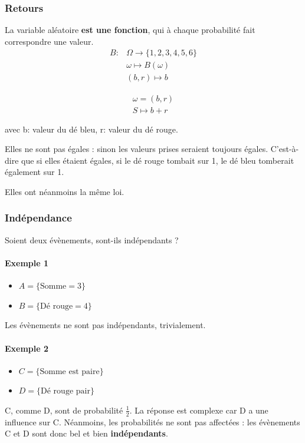 \documentclass[11pt]{article}
\begin{document}
\subsubsection{Retours}
La variable aléatoire \textbf{est une fonction}, qui à chaque probabilité fait
correspondre une valeur.
\begin{align*}
    B: &\Omega \to \{1,2,3,4,5,6\} \\
    &\omega \mapsto B(\omega) \\
    &(b, r) \mapsto b
\end{align*}


\begin{align*}
    \omega = (b, r) \\
    S \mapsto b+r
\end{align*}

avec b: valeur du dé bleu, r: valeur du dé rouge.

Elles ne sont pas égales : sinon les valeurs prises seraient toujours égales.
C'est-à-dire que si elles étaient égales, si le dé rouge tombait sur 1, le dé
bleu tomberait également sur 1.

Elles ont néanmoins la même loi.

\subsubsection{Indépendance} Soient deux évènements, sont-ils indépendants ?

\paragraph{Exemple 1}
\begin{itemize}
    \item $A = \{\text{Somme} = 3\}$
    \item $B = \{\text{Dé rouge} = 4\}$
\end{itemize}
Les évènements ne sont pas indépendants, trivialement.


\paragraph{Exemple 2}
\begin{itemize}
    \item $C = \{\text{Somme est paire} \}$
    \item $D = \{\text{Dé rouge pair} \}$
\end{itemize}
C, comme D, sont de probabilité $\frac{1}{2}$. La réponse est complexe car D a
une influence sur C. Néanmoins, les probabilités ne sont pas affectées : les
évènements C et D sont donc bel et bien \textbf{indépendants}.
\end{document}
